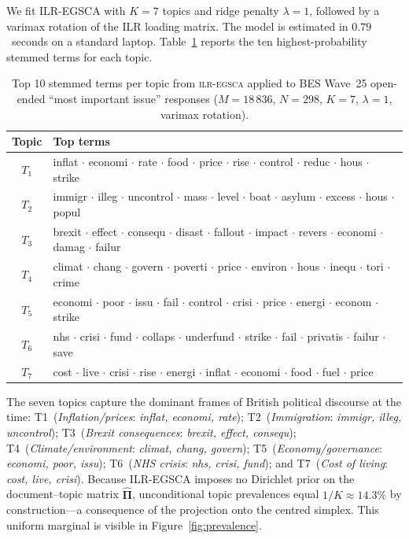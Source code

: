 We fit ILR-EGSCA with $K = 7$ topics and ridge penalty $\lambda = 1$,
followed by a varimax rotation of the ILR loading matrix.  The model is
estimated in $0.79$~seconds on a standard laptop.  Table~\ref{tab:bes_topics}
reports the ten highest-probability stemmed terms for each topic.

\begin{table}[!ht]
\centering
\small
\caption{Top 10 stemmed terms per topic from \textsc{ilr-egsca} applied to
BES Wave~25 open-ended ``most important issue'' responses
($M=18\,836$, $N=298$, $K=7$, $\lambda=1$, varimax rotation).}
\label{tab:bes_topics}
\begin{tabular}{cl}
\toprule
Topic & Top terms \\
\midrule
$T_1$ & inflat $\cdot$ economi $\cdot$ rate $\cdot$ food $\cdot$ price $\cdot$ rise $\cdot$ control $\cdot$ reduc $\cdot$ hous $\cdot$ strike \\
$T_2$ & immigr $\cdot$ illeg $\cdot$ uncontrol $\cdot$ mass $\cdot$ level $\cdot$ boat $\cdot$ asylum $\cdot$ excess $\cdot$ hous $\cdot$ popul \\
$T_3$ & brexit $\cdot$ effect $\cdot$ consequ $\cdot$ disast $\cdot$ fallout $\cdot$ impact $\cdot$ revers $\cdot$ economi $\cdot$ damag $\cdot$ failur \\
$T_4$ & climat $\cdot$ chang $\cdot$ govern $\cdot$ poverti $\cdot$ price $\cdot$ environ $\cdot$ hous $\cdot$ inequ $\cdot$ tori $\cdot$ crime \\
$T_5$ & economi $\cdot$ poor $\cdot$ issu $\cdot$ fail $\cdot$ control $\cdot$ crisi $\cdot$ price $\cdot$ energi $\cdot$ econom $\cdot$ strike \\
$T_6$ & nhs $\cdot$ crisi $\cdot$ fund $\cdot$ collaps $\cdot$ underfund $\cdot$ strike $\cdot$ fail $\cdot$ privatis $\cdot$ failur $\cdot$ save \\
$T_7$ & cost $\cdot$ live $\cdot$ crisi $\cdot$ rise $\cdot$ energi $\cdot$ inflat $\cdot$ economi $\cdot$ food $\cdot$ fuel $\cdot$ price \\
\bottomrule
\end{tabular}
\end{table}

The seven topics capture the dominant frames of British political discourse
at the time: T1~(\emph{Inflation/prices}: \textit{inflat, economi, rate});
T2~(\emph{Immigration}: \textit{immigr, illeg, uncontrol});
T3~(\emph{Brexit consequences}: \textit{brexit, effect, consequ});
T4~(\emph{Climate/environment}: \textit{climat, chang, govern});
T5~(\emph{Economy/governance}: \textit{economi, poor, issu});
T6~(\emph{NHS crisis}: \textit{nhs, crisi, fund}); and
T7~(\emph{Cost of living}: \textit{cost, live, crisi}).
Because ILR-EGSCA imposes no Dirichlet prior on the document--topic
matrix $\hat{\boldsymbol{\Pi}}$, unconditional topic prevalences equal
$1/K \approx 14.3\%$ by construction---a consequence of the projection
onto the centred simplex.  This uniform marginal is visible in
Figure~\ref{fig:prevalence}.

